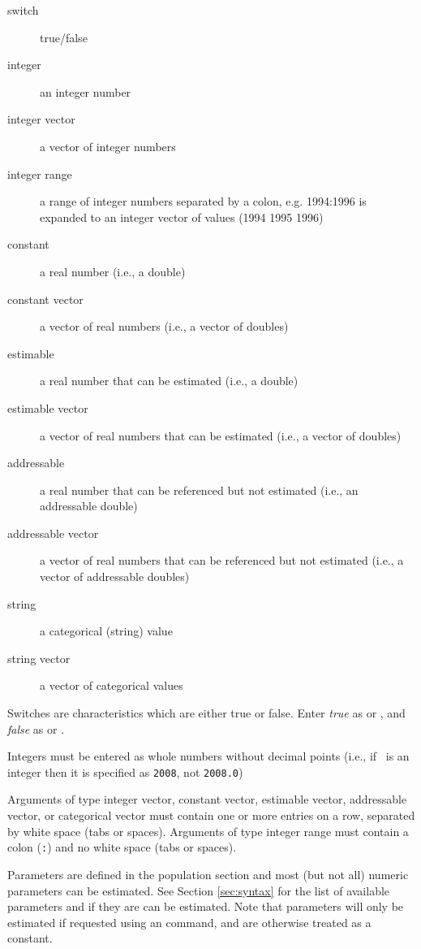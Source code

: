 \begin{description}
    \item[switch] true/false
    \item[integer] an integer number
	\item[integer vector] a vector of integer numbers
	\item[integer range] a range of integer numbers separated by a colon, e.g. 1994:1996 is expanded to an integer vector of values (1994 1995 1996)
	\item[constant] a real number (i.e., a double)
	\item[constant vector] a vector of real numbers (i.e., a vector of doubles)
	\item[estimable] a real number that can be estimated (i.e., a double)
	\item[estimable vector] a vector of real numbers that can be estimated (i.e., a vector of doubles)
	\item[addressable] a real number that can be referenced but not estimated (i.e., an addressable double)
	\item[addressable vector] a vector of real numbers that can be referenced but not estimated (i.e., a vector of addressable doubles)
	\item[string] a categorical (string) value
	\item[string vector] a vector of categorical values
\end{description}

Switches are characteristics which are either true or false. Enter \emph{true} as  or , and \emph{false} as  or .

Integers must be entered as whole numbers without decimal points (i.e., if \ is an integer then it is specified as \texttt{2008}, not \texttt{2008.0})

Arguments of type integer vector, constant vector, estimable vector, addressable vector, or categorical vector must contain one or more entries on a row, separated by white space (tabs or spaces). Arguments of type integer range must contain a colon (\texttt{:}) and no white space (tabs or spaces).

Parameters are defined in the population section and most (but not all) numeric parameters can be estimated. See Section \ref{sec:syntax} for the list of available parameters and if they are can be estimated. Note that parameters will only be estimated if requested using an  command, and are otherwise treated as a constant.

